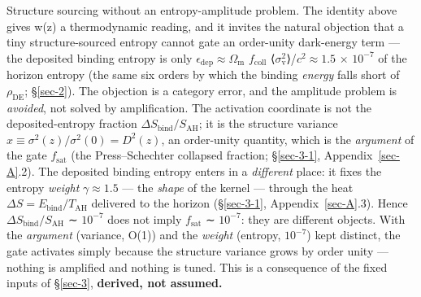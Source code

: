\documentclass[preprint,12pt]{elsarticle}
\begin{document}
Structure sourcing without an entropy-amplitude problem. The identity
above gives w(z) a thermodynamic reading, and it invites the natural
objection that a tiny structure-sourced entropy cannot gate an
order-unity dark-energy term --- the deposited binding entropy is only
\(\epsilon _{\mathrm{dep}} \approx  \Omega _{\mathrm{m}}\)
\(f_{\mathrm{coll}}\)
⟨\(\sigma _{\mathrm{v}}^{2}\)⟩/\(c^{2} \approx  1.5\) × \(10^{-7}\) of
the horizon entropy (the same six orders by which the binding
\emph{energy} falls short of \(\rho _\mathrm{DE}\); §\ref{sec-2}). The
objection is a category error, and the amplitude problem is
\emph{avoided}, not solved by amplification. The activation coordinate
is not the deposited-entropy fraction
\(\Delta S_{\mathrm{bind}}/S_\mathrm{AH}\); it is the structure variance
\(x \equiv  \sigma ^{2}(z)/\sigma ^{2}(0) = D^{2}(z)\), an order-unity
quantity, which is the \emph{argument} of the gate \(f_{\mathrm{sat}}\)
(the Press--Schechter collapsed fraction; §\ref{sec-3-1},
Appendix~\ref{sec-A}.2). The deposited binding entropy enters in a
\emph{different} place: it fixes the entropy \emph{weight}
\(\gamma  \approx  1.5\) --- the \emph{shape} of the kernel --- through
the heat \(\Delta S = E_{\mathrm{bind}}/T_\mathrm{AH}\) delivered to the
horizon (§\ref{sec-3-1}, Appendix~\ref{sec-A}.3). Hence
\(\Delta S_{\mathrm{bind}}/S_\mathrm{AH}\) ∼ \(10^{-7}\) does not imply
\(f_{\mathrm{sat}}\) ∼ \(10^{-7}\): they are different objects. With the
\emph{argument} (variance, O(1)) and the \emph{weight} (entropy,
\(10^{-7}\)) kept distinct, the gate activates simply because the
structure variance grows by order unity --- nothing is amplified and
nothing is tuned. This is a consequence of the fixed inputs of
§\ref{sec-3}, \textbf{derived, not assumed.}
\end{document}
